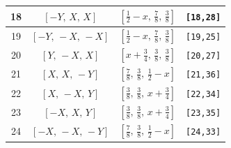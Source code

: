 \documentclass[fleqn,8pt]{jsarticle}
\begin{document}
\begin{longtable}{cccc}
18 & $\left[ - Y,\, X,\, X \right]$ & $\left[ \frac{1}{2} - x,\, \frac{7}{8},\, \frac{3}{8} \right]$ & {\tt [18,28]} \\ \hline
19 & $\left[ - Y,\, - X,\, - X \right]$ & $\left[ \frac{1}{2} - x,\, \frac{7}{8},\, \frac{3}{8} \right]$ & {\tt [19,25]} \\ \hline
20 & $\left[ Y,\, - X,\, X \right]$ & $\left[ x + \frac{3}{4},\, \frac{3}{8},\, \frac{3}{8} \right]$ & {\tt [20,27]} \\ \hline
21 & $\left[ X,\, X,\, - Y \right]$ & $\left[ \frac{7}{8},\, \frac{3}{8},\, \frac{1}{2} - x \right]$ & {\tt [21,36]} \\ \hline
22 & $\left[ X,\, - X,\, Y \right]$ & $\left[ \frac{3}{8},\, \frac{3}{8},\, x + \frac{3}{4} \right]$ & {\tt [22,34]} \\ \hline
23 & $\left[ - X,\, X,\, Y \right]$ & $\left[ \frac{3}{8},\, \frac{3}{8},\, x + \frac{3}{4} \right]$ & {\tt [23,35]} \\ \hline
24 & $\left[ - X,\, - X,\, - Y \right]$ & $\left[ \frac{7}{8},\, \frac{3}{8},\, \frac{1}{2} - x \right]$ & {\tt [24,33]} \\
\end{longtable}
\renewcommand{\arraystretch}{1.2}
\end{document}
